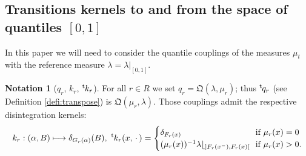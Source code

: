\documentclass[11pt]{article}
\newcommand\mto{\mathchoice{\longmapsto}{\mapsto}{\mapsto}{\mapsto}}
\theoremstyle{plain}
\theoremstyle{definition}
\newtheorem{notation}[them]{Notation} %
\newcommand{\como}{\mathfrak{Q}}
\let\mb\relax
\let\mn\relax
\newcommand{\trans}{{}^{\mathrm{t}}\mkern-1mu}
\newcommand{\espcdot}{\mbox{$\,\cdot\,$}}
\newcommand{\Lg}{\lambda|_{[0,1]}}
\newcommand{\la}{\lambda}
\begin{document}
\subsection{Transitions kernels to and from the space of quantiles \mb$[0,1]$\mn}\label{subsec:little_t}
In this paper we will need to consider the quantile couplings of the measures $\mu_t$ with the reference measure $\la=\Lg$.

\begin{notation}[$q_r$, $k_r$, $\trans k_r$] \label{notation:kernels} For all $r\in R$ we set $q_r= \como(\la,\mu_r)$; thus $\trans q_r$ (see Definition \ref{defi:transpose}) is $\como(\mu_r, \lambda)$. Those couplings admit the respective disintegration kernels:\vspace*{-3pt}
\begin{align*}
k_r:(\alpha,B)\mto \delta_{G_{r}(\alpha)}(B),\ \trans{k}_r(x,\espcdot)=
\begin{cases}
\delta_{F_r(x)}&\!\!\text{if }\mu_r(x)=0\\
(\mu_r(x))^{-1}\la\lfloor_{]F_r(x^-),F_r(x)[}&\!\!\text{if }\mu_r(x)>0.\\
\end{cases}
\end{align*}
\end{notation}
\end{document}
